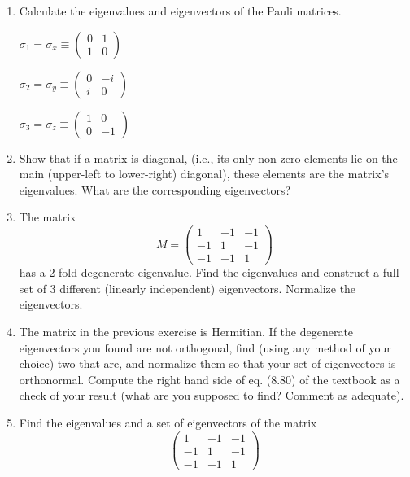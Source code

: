 \documentclass[fleqn]{article}
\begin{document}
  \begin{enumerate}
    \item Calculate the eigenvalues and eigenvectors of the Pauli matrices.

      \textcolor{hwColor}{ 
        $\sigma_1=\sigma_x\equiv
        \begin{pmatrix}
          0 & 1 \\
          1 & 0 
        \end{pmatrix}
        $
      }

      \textcolor{hwColor}{ 
        $\sigma_2=\sigma_y\equiv
        \begin{pmatrix}
          0 & -i \\
          i & 0 
        \end{pmatrix}
        $
      }

      \textcolor{hwColor}{ 
        $\sigma_3=\sigma_z\equiv
        \begin{pmatrix}
          1 & 0 \\
          0 & -1 
        \end{pmatrix}
        $
      }


    \item Show that if a matrix is diagonal, (i.e., its only non-zero elements lie on the main (upper-left to lower-right) diagonal), these elements are the matrix's eigenvalues. What are the corresponding eigenvectors?

    \item The matrix 
      $$M = 
      \begin{pmatrix}
      1 & -1 & -1 \\
      -1 & 1 & -1 \\
      -1 & -1 & 1
      \end{pmatrix}
      $$
      has a 2-fold degenerate eigenvalue. Find the eigenvalues and construct a full set of 3 different
      (linearly independent) eigenvectors. Normalize the eigenvectors.

    \item The matrix in the previous exercise is Hermitian. If the degenerate eigenvectors you found are not orthogonal, find (using any method of your choice) two that are, and normalize them so that your set of eigenvectors is orthonormal.
      Compute the right hand side of eq. (8.80) of the textbook as a check of your result (what are you supposed to find? Comment as adequate).

    \item Find the eigenvalues and a set of eigenvectors of the matrix
      $$ 
      \begin{pmatrix}
      1 & -1 & -1 \\
      -1 & 1 & -1 \\
      -1 & -1 & 1
      \end{pmatrix}
      $$


\end{enumerate}
\end{document}
